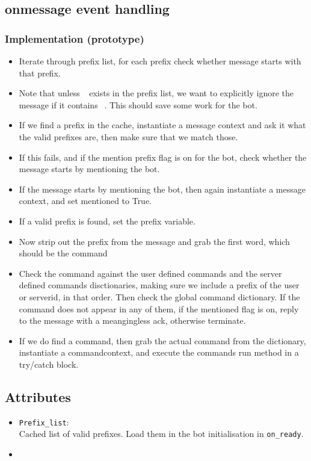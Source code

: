 \documentclass[a4paper]{amsart}
\begin{document}
\subsection{onmessage event handling}
    \subsubsection{Implementation (prototype)}
        \begin{itemize}
            \item Iterate through prefix list, for each prefix check whether message starts with that prefix.
            \item Note that unless $~~$ exists in the prefix list, we want to explicitly ignore the message if it contains $~~$. This should save some work for the bot.
            \item If we find a prefix in the cache, instantiate a message context and ask it what the valid prefixes are, then make sure that we match those.
            \item If this fails, and if the mention prefix flag is on for the bot, check whether the message starts by mentioning the bot.
            \item If the message starts by mentioning the bot, then again instantiate a message context, and set mentioned to True.
            \item If a valid prefix is found, set the prefix variable.
            \item Now strip out the prefix from the message and grab the first word, which should be the command
            \item Check the command against the user defined commands and the server defined commands disctionaries, making sure we include a prefix of the user or serverid, in that order. Then check the global command dictionary. If the command does not appear in any of them, if the mentioned flag is on, reply to the message with a meangingless ack, otherwise terminate.
            \item If we do find a command, then grab the actual command from the dictionary, instantiate a commandcontext, and execute the commands run method in a try/catch block.
        \end{itemize}
\subsection{Attributes}
    \begin{itemize}
        \item \verb|Prefix_list|:\\
            Cached list of valid prefixes. Load them in the bot initialisation in \verb|on_ready|.
        \item 
    \end{itemize}
\end{document}
